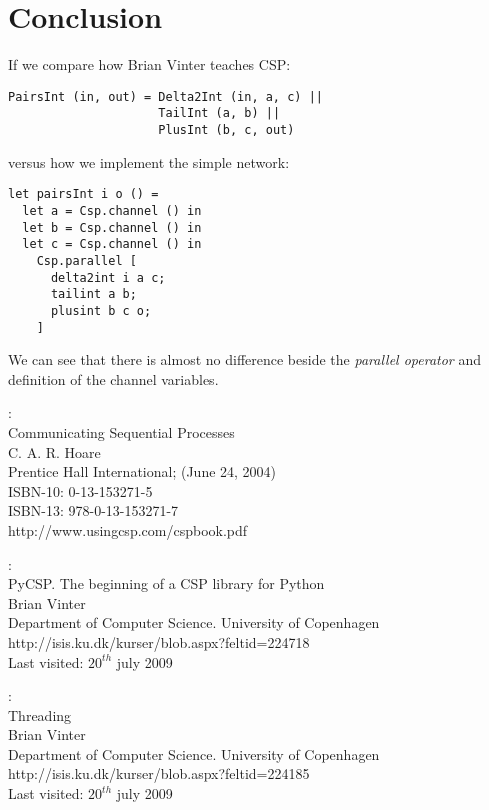 \documentclass[a4paper,12pt]{article}
\begin{document}
\section{Conclusion}
\label{conclusion}

If we compare how Brian Vinter teaches CSP\cite{vinter}:
\begin{center}
\begin{verbatim}
PairsInt (in, out) = Delta2Int (in, a, c) || 
                     TailInt (a, b) || 
                     PlusInt (b, c, out) 
\end{verbatim}
\end{center}

versus how we implement the simple network:

\begin{verbatim}
let pairsInt i o () =
  let a = Csp.channel () in
  let b = Csp.channel () in
  let c = Csp.channel () in
    Csp.parallel [
      delta2int i a c;
      tailint a b;
      plusint b c o;
    ]
\end{verbatim}

We can see that there is almost no difference beside the {\it parallel operator}
and definition of the channel variables.

\begin{thebibliography}{99}

:\\
Communicating Sequential Processes\\
C. A. R. Hoare\\
Prentice Hall International; (June 24, 2004)\\
ISBN-10: 0-13-153271-5\\
ISBN-13: 978-0-13-153271-7\\
http://www.usingcsp.com/cspbook.pdf


:\\
PyCSP. The beginning of a CSP library for Python\\
Brian Vinter\\
Department of Computer Science. University of Copenhagen\\
http://isis.ku.dk/kurser/blob.aspx?feltid=224718\\
Last visited: $20^{th}$ july 2009

:\\
Threading\\
Brian Vinter\\
Department of Computer Science. University of Copenhagen\\
http://isis.ku.dk/kurser/blob.aspx?feltid=224185\\
Last visited: $20^{th}$ july 2009



\end{thebibliography}
\end{document}
